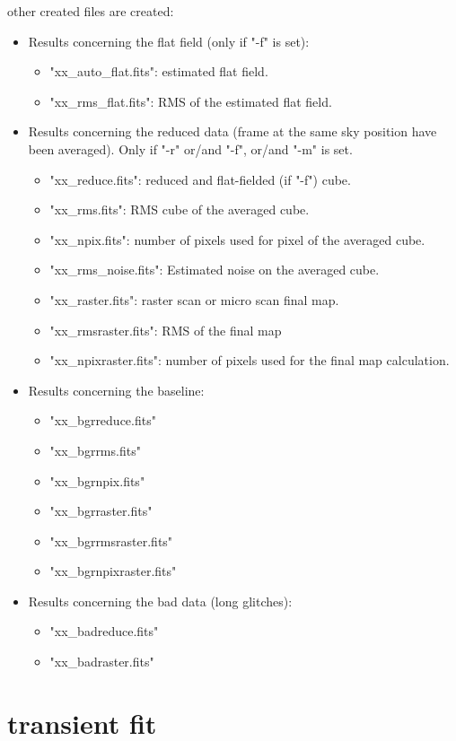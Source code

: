 other created files are created:
\begin{itemize}
\item Results concerning the flat field (only if "-f" is set):
\begin{itemize}
\item "xx\_auto\_flat.fits": estimated flat field.
\item "xx\_rms\_flat.fits": RMS of the estimated flat field.
\end{itemize}
\item Results concerning the reduced data (frame at the same sky position
have been averaged). Only if "-r" or/and "-f", or/and "-m" is set.
\begin{itemize}
\item "xx\_reduce.fits": reduced and flat-fielded (if "-f") cube.
\item "xx\_rms.fits": RMS cube of the averaged cube.
\item "xx\_npix.fits": number of pixels used for pixel of the averaged cube.
\item "xx\_rms\_noise.fits": Estimated noise on the averaged cube.
\item "xx\_raster.fits": raster scan or micro scan final map.
\item "xx\_rmsraster.fits": RMS of the final map
\item "xx\_npixraster.fits": number of pixels used
 for the final map calculation.
\end{itemize}
\item Results concerning the baseline:
\begin{itemize}
\item "xx\_bgrreduce.fits"
\item "xx\_bgrrms.fits"
\item "xx\_bgrnpix.fits"
\item "xx\_bgrraster.fits"
\item "xx\_bgrrmsraster.fits"
\item "xx\_bgrnpixraster.fits"
\end{itemize}
\item Results concerning the bad data (long glitches):
\begin{itemize}
\item "xx\_badreduce.fits"
\item "xx\_badraster.fits"
\end{itemize}
\end{itemize}
 
\clearpage
\section{transient fit}

